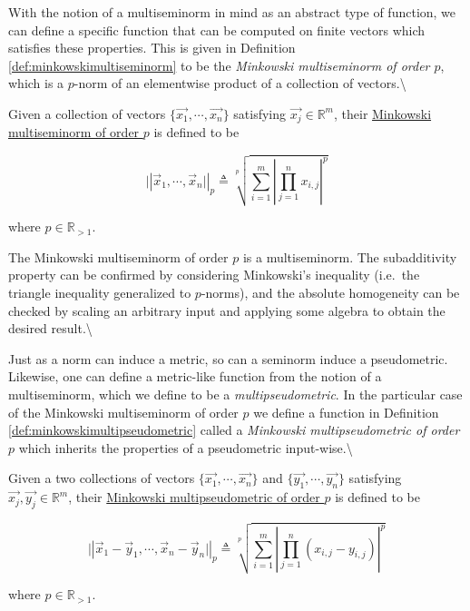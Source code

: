 \documentclass[
  letterpaper,
  DIV=11,
  numbers=noendperiod]{scrreprt}
\begin{document}
With the notion of a multiseminorm in mind as an abstract type of
function, we can define a specific function that can be computed on
finite vectors which satisfies these properties. This is given in
Definition \ref{def:minkowskimultiseminorm} to be the
\textit{Minkowski multiseminorm of order $p$}, which is a \(p\)-norm of
an elementwise product of a collection of vectors.\textbackslash{}

\begin{Definition}[mydefinition=Minkowski Multiseminorm of Order P, label=def:minkowskimultiseminorm]
Given a collection of vectors $\{\vec{x_1}, \cdots, \vec{x_n} \}$ satisfying $\vec{x_j} \in \mathbb{R}^m$, their \underline{Minkowski multiseminorm of order $p$}  is defined to be

$$\vert| \vec{x}_1, \cdots, \vec{x}_n \vert|_p \triangleq \sqrt[p]{ \sum_{i=1}^{m} \left| \prod_{j=1}^{n} x_{i,j} \right|^p}$$

where $p \in \mathbb{R}_{>1}$.
\end{Definition}

The Minkowski multiseminorm of order \(p\) is a multiseminorm. The
subadditivity property can be confirmed by considering Minkowski's
inequality (i.e.~the triangle inequality generalized to \(p\)-norms),
and the absolute homogeneity can be checked by scaling an arbitrary
input and applying some algebra to obtain the desired
result.\textbackslash{}

Just as a norm can induce a metric, so can a seminorm induce a
pseudometric. Likewise, one can define a metric-like function from the
notion of a multiseminorm, which we define to be a
\textit{multipseudometric}. In the particular case of the Minkowski
multiseminorm of order \(p\) we define a function in Definition
\ref{def:minkowskimultipseudometric} called a
\textit{Minkowski multipseudometric of order $p$} which inherits the
properties of a pseudometric input-wise.\textbackslash{}

\begin{Definition}[mydefinition=Minkowski Multipseudometric of Order P, label=def:minkowskimultipseudometric]
Given a two collections of vectors $\{\vec{x_1},  \cdots, \vec{x_n} \}$ and $\{ \vec{y_1}, \cdots, \vec{y_n} \}$ satisfying $\vec{x_j}, \vec{y_j} \in \mathbb{R}^m$, their \underline{Minkowski multipseudometric of order $p$}  is defined to be

$$\vert| \vec{x}_1 - \vec{y}_1, \cdots, \vec{x}_n - \vec{y}_n \vert|_p \triangleq \sqrt[p]{ \sum_{i=1}^{m} \left| \prod_{j=1}^{n} \left( x_{i,j} - y_{i,j} \right) \right|^p}$$

where $p \in \mathbb{R}_{>1}$.
\end{Definition}
\end{document}
